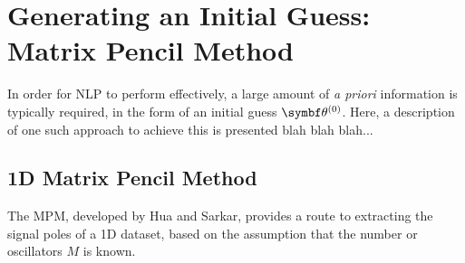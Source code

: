 \section{Generating an Initial Guess: Matrix Pencil Method}
\label{sec:mpm}
In order for \ac{NLP} to perform effectively, a large amount of \textit{a
priori} information is typically required, in the form of an initial guess
$\bthzero$. Here, a description of one such approach to achieve this is presented blah blah blah...

\subsection{1D Matrix Pencil Method}
The \ac{MPM}, developed by Hua and Sarkar\cite{Hua1990,Hua1990b,Hua1991}, provides a
route to extracting the signal poles of a \ac{1D} dataset, based on the
assumption that the number or oscillators $M$ is known.

